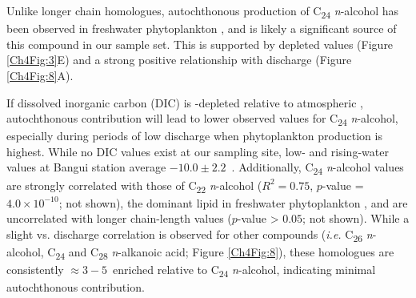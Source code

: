 Unlike longer chain homologues, autochthonous production of C\textsubscript{24} \textit{n}-alcohol has been observed in freshwater phytoplankton \citep{Volkman:1998tk,Volkman:1999tq,Xu:2007jk}, and is likely a significant source of this compound in our sample set. This is supported by depleted  values (Figure \ref{Ch4Fig:3}E) and a strong positive relationship with discharge (Figure \ref{Ch4Fig:8}A). 

If dissolved inorganic carbon (DIC) is -depleted relative to atmospheric , autochthonous contribution will lead to lower observed  values for C\textsubscript{24} \textit{n}-alcohol, especially during periods of low discharge when phytoplankton production is highest. While no DIC  values exist at our sampling site, low- and rising-water values at Bangui station average $-10.0 \pm 2.2$\textperthousand\ \citep[$n = 30$;][]{Bouillon:2012cw,Bouillon:2014ko}.  Additionally, C\textsubscript{24} \textit{n}-alcohol  values are strongly correlated with those of C\textsubscript{22} \textit{n}-alcohol ($R^2 = 0.75$, $p$-value = $4.0 \times 10^{-10}$; not shown), the dominant lipid in freshwater phytoplankton \citep{Volkman:1998tk,Volkman:1999tq,Xu:2007jk}, and are uncorrelated with longer chain-length values ($p$-value > $0.05$; not shown). While a slight  vs. discharge correlation is observed for other compounds (\textit{i.e.} C\textsubscript{26} \textit{n}-alcohol, C\textsubscript{24} and C\textsubscript{28} \textit{n}-alkanoic acid; Figure \ref{Ch4Fig:8}), these homologues are consistently $\approx 3-5$\textperthousand\ enriched relative to C\textsubscript{24} \textit{n}-alcohol, indicating minimal autochthonous contribution.

